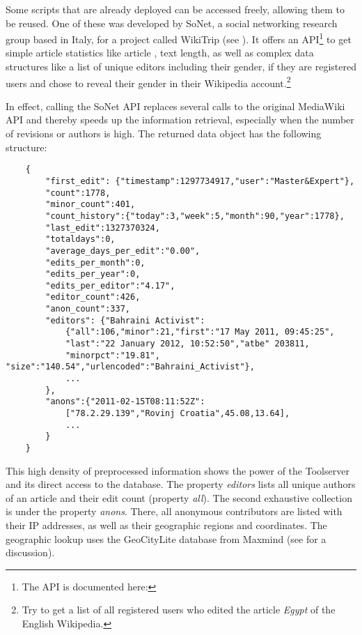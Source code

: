 Some scripts that are already deployed can be accessed freely, allowing them to be reused.
One of these was developed by SoNet, a social networking research group based in Italy, for a project called WikiTrip (see ).
It offers an \ac{API}\footnote{The \ac{API} is documented here: } to get simple article statistics like article , text length, as well as complex data structures like a list of unique editors including their gender, if they are registered users and chose to reveal their gender in their Wikipedia account.\footnote{Try  to get a list of all registered users who edited the article \emph{Egypt} of the English Wikipedia.}

In effect, calling the SoNet \ac{API} replaces several calls to the original MediaWiki \ac{API} and thereby speeds up the information retrieval, especially when the number of revisions or authors is high.
The returned data object has the following structure:

\begin{lstlisting}
	{
		"first_edit": {"timestamp":1297734917,"user":"Master&Expert"},
		"count":1778,
		"minor_count":401,
		"count_history":{"today":3,"week":5,"month":90,"year":1778},
		"last_edit":1327370324,
		"totaldays":0,
		"average_days_per_edit":"0.00",
		"edits_per_month":0,
		"edits_per_year":0,
		"edits_per_editor":"4.17",
		"editor_count":426,
		"anon_count":337,
		"editors": {"Bahraini Activist":
			{"all":106,"minor":21,"first":"17 May 2011, 09:45:25",
			"last":"22 January 2012, 10:52:50","atbe" 203811,
			"minorpct":"19.81", "size":"140.54","urlencoded":"Bahraini_Activist"},
			...
		},
		"anons":{"2011-02-15T08:11:52Z":
			["78.2.29.139","Rovinj Croatia",45.08,13.64],
			...
		}
	}
\end{lstlisting}

This high density of preprocessed information shows the power of the Toolserver and its direct access to the database.
The property \emph{editors} lists all unique authors of an article and their edit count (property \emph{all}).
The second exhaustive collection is under the property \emph{anons}. 
There, all anonymous contributors are listed with their \ac{IP} addresses, as well as their geographic regions and coordinates.
The geographic lookup uses the GeoCityLite database from Maxmind (see  for a discussion).

